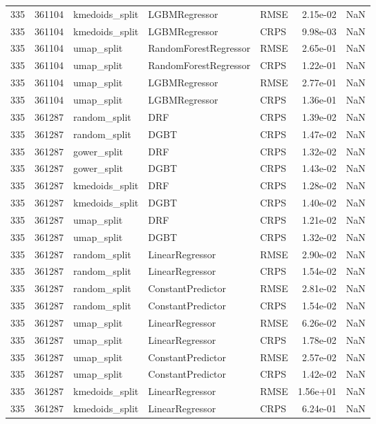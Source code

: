 \begin{tabular}{rrlllrr}
335 & 361104 & kmedoids\_split & LGBMRegressor & RMSE & 2.15e-02 & NaN \\
335 & 361104 & kmedoids\_split & LGBMRegressor & CRPS & 9.98e-03 & NaN \\
335 & 361104 & umap\_split & RandomForestRegressor & RMSE & 2.65e-01 & NaN \\
335 & 361104 & umap\_split & RandomForestRegressor & CRPS & 1.22e-01 & NaN \\
335 & 361104 & umap\_split & LGBMRegressor & RMSE & 2.77e-01 & NaN \\
335 & 361104 & umap\_split & LGBMRegressor & CRPS & 1.36e-01 & NaN \\
335 & 361287 & random\_split & DRF & CRPS & 1.39e-02 & NaN \\
335 & 361287 & random\_split & DGBT & CRPS & 1.47e-02 & NaN \\
335 & 361287 & gower\_split & DRF & CRPS & 1.32e-02 & NaN \\
335 & 361287 & gower\_split & DGBT & CRPS & 1.43e-02 & NaN \\
335 & 361287 & kmedoids\_split & DRF & CRPS & 1.28e-02 & NaN \\
335 & 361287 & kmedoids\_split & DGBT & CRPS & 1.40e-02 & NaN \\
335 & 361287 & umap\_split & DRF & CRPS & 1.21e-02 & NaN \\
335 & 361287 & umap\_split & DGBT & CRPS & 1.32e-02 & NaN \\
335 & 361287 & random\_split & LinearRegressor & RMSE & 2.90e-02 & NaN \\
335 & 361287 & random\_split & LinearRegressor & CRPS & 1.54e-02 & NaN \\
335 & 361287 & random\_split & ConstantPredictor & RMSE & 2.81e-02 & NaN \\
335 & 361287 & random\_split & ConstantPredictor & CRPS & 1.54e-02 & NaN \\
335 & 361287 & umap\_split & LinearRegressor & RMSE & 6.26e-02 & NaN \\
335 & 361287 & umap\_split & LinearRegressor & CRPS & 1.78e-02 & NaN \\
335 & 361287 & umap\_split & ConstantPredictor & RMSE & 2.57e-02 & NaN \\
335 & 361287 & umap\_split & ConstantPredictor & CRPS & 1.42e-02 & NaN \\
335 & 361287 & kmedoids\_split & LinearRegressor & RMSE & 1.56e+01 & NaN \\
335 & 361287 & kmedoids\_split & LinearRegressor & CRPS & 6.24e-01 & NaN \\

\end{tabular}
